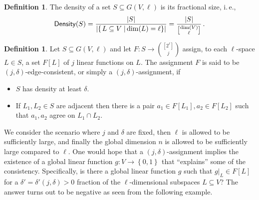 \documentclass[11pt]{article}
\numberwithin{equation}{section}
\theoremstyle{definition}
\newtheorem{definition}[theorem]{Definition}
\theoremstyle{plain}
\newcommand{\ie}{i.\,e.}
\newcommand\card[1]{\left| {#1} \right|}
\newcommand\sett[2]{\left\{ \left. #1 \;\right\vert #2 \right\}}
\newcommand\set[1]{{\left\{ #1 \right\}}}
\newcommand\power[1]{\set{0,1}^{#1}}
\begin{document}
\begin{definition}
The density of a set $S\subseteq G(V,\ell)$ is its fractional size, \ie,
\[
{\sf Density}(S)= \frac{|S|}{\card{\sett{L\subseteq V}{\dim (L) = \ell}}} = \frac{\card{S}}{{\dim(V) \brack \ell}}\,.%
\]
\end{definition}

\begin{definition}\label{def:edge_consistent} Let $S\subseteq G(V,\ell)$ and let $F: S \to {[2^\ell] \choose j}$
 assign, to each $\ell$-space  $L \in S$, a set  $F[L]$ of $j$ linear functions on $L$. The assignment $F$ is
 said to be $(j,\delta)$-edge-consistent, or simply a $(j,\delta)$-assignment, if
 \begin{itemize}
 \item $S$ has density at least $\delta$.
 \item If $L_1,L_2\in S$ are %
adjacent  %
then
there is a pair $a_1\in F[L_1],a_2\in F[L_2]$ such that $a_1,a_2$ agree on $L_1\cap L_2$.
\end{itemize}
\end{definition}

We consider the scenario where $j$ and $\delta$ are fixed,
%
 then $\ell$ is allowed to be
sufficiently large, and finally
the global dimension $n$ is allowed to be sufficiently large compared to $\ell$.
One would hope that a $(j,\delta)$-assignment implies the existence of
a global linear function $g\colon V\to\power{}$ that ``explains'' some of the consistency.
Specifically, is there a global linear function $g$ such that $g|_L \in F[L]$ for
 a %
$\delta' = \delta'(j,
\delta)>0$ fraction of the $\ell$-dimensional subspaces $L\subseteq V$? The answer turns out to be negative as seen from the following example.
\end{document}
